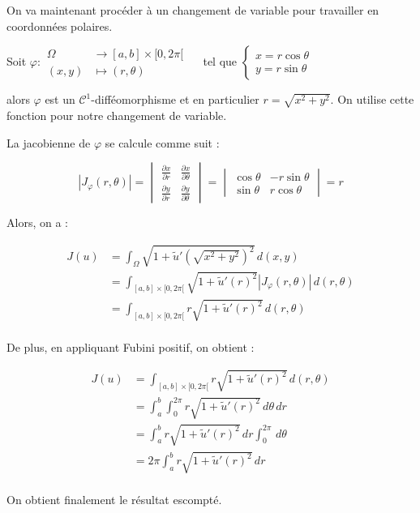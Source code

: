 \documentclass{article}
\newcommand{\Abs}[1]{ \left| #1 \right| }
\newcommand{\FunctionWithSqrt}[1]{ \sqrt{1 + #1 ^2} }
\newcommand{\Integral}[4]{ \int_{#1}^{#2} #3 \, d#4 }
\begin{document}
{    On va maintenant procéder à un changement de variable pour travailler en coordonnées polaires. \newline

    Soit $\varphi :
    \begin{aligned}
    \Omega &\longrightarrow [a,b] \times [0,2\pi[\\
    (x,y) &\longmapsto (r,\theta)
    \end{aligned} \quad$ 
    tel que $
    \left\{
        \begin{array}{l}
        x = r \cos\theta \\
        y = r \sin\theta
        \end{array}
    \right.$
    
    alors $\varphi$ est un $\mathcal{C}^1$-difféomorphisme et en particulier $r=\sqrt{x^2+y^2}$. On utilise cette fonction pour notre changement de variable.

    La jacobienne de $\varphi$ se calcule comme suit :

    \begin{equation*}
        \Abs{J_\varphi(r,\theta)} =
        \begin{vmatrix}
        \frac{\partial x}{\partial r} & \frac{\partial x}{\partial \theta} \\
        \frac{\partial y}{\partial r} & \frac{\partial y}{\partial \theta}
        \end{vmatrix} = 
        \begin{vmatrix}
        \cos \theta & -r \sin \theta \\
        \sin \theta & r \cos \theta
        \end{vmatrix} = r
    \end{equation*}

    Alors, on a :

    \begin{align*}
        J(u) &= \Integral{\Omega}{}{\FunctionWithSqrt{\tilde{u}'(\sqrt{x^2+y^2})}}{(x,y)} \\
        &= \Integral{[a,b]\times[0,2\pi[}{}{ \FunctionWithSqrt{\tilde{u}'(r)}\Abs{J_\varphi(r,\theta)} }{(r,\theta)} \\
        &= \Integral{[a,b]\times[0,2\pi[}{}{ r \FunctionWithSqrt{\tilde{u}'(r)} }{(r,\theta)} \\
    \end{align*}

    De plus, en appliquant Fubini positif, on obtient :

    \begin{align*}
        J(u) &= \Integral{[a,b]\times[0,2\pi[}{}{ r \FunctionWithSqrt{\tilde{u}'(r)} }{(r,\theta)} \\
        &= \Integral{a}{b}{ \Integral{0}{2\pi}{r \FunctionWithSqrt{\tilde{u}'(r)}}{\theta} }{r} \\
        &= \Integral{a}{b}{ r \FunctionWithSqrt{\tilde{u}'(r)} }{r} \Integral{0}{2\pi}{}{\theta}\\
        &= 2\pi \Integral{a}{b}{ r \FunctionWithSqrt{\tilde{u}'(r)} }{r}\\
    \end{align*}

    On obtient finalement le résultat escompté.
}
\end{document}
